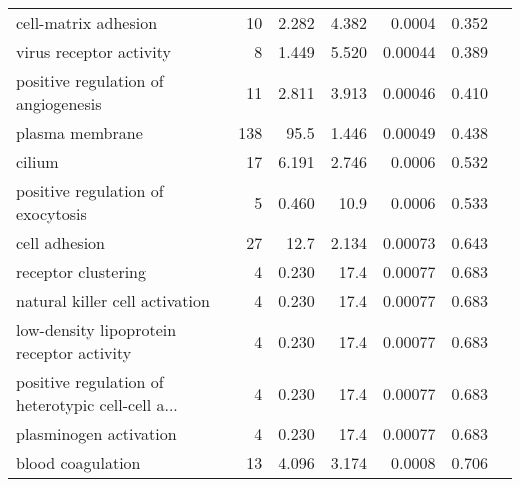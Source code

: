 \begin{longtable}{|l|r|r|r|r|r|}
                              cell-matrix adhesion &                      10 &                   2.282 &      4.382 &               0.0004 &                       0.352~~ \\
                           virus receptor activity &                       8 &                   1.449 &      5.520 &              0.00044 &                       0.389~~ \\
               positive regulation of angiogenesis &                      11 &                   2.811 &      3.913 &              0.00046 &                       0.410~~ \\
                                   plasma membrane &                     138 &                    95.5 &      1.446 &              0.00049 &                       0.438~~ \\
                                            cilium &                      17 &                   6.191 &      2.746 &               0.0006 &                       0.532~~ \\
                 positive regulation of exocytosis &                       5 &                   0.460 &       10.9 &               0.0006 &                       0.533~~ \\
                                     cell adhesion &                      27 &                    12.7 &      2.134 &              0.00073 &                       0.643~~ \\
                               receptor clustering &                       4 &                   0.230 &       17.4 &              0.00077 &                       0.683~~ \\
                    natural killer cell activation &                       4 &                   0.230 &       17.4 &              0.00077 &                       0.683~~ \\
         low-density lipoprotein receptor activity &                       4 &                   0.230 &       17.4 &              0.00077 &                       0.683~~ \\
 positive regulation of heterotypic cell-cell a... &                       4 &                   0.230 &       17.4 &              0.00077 &                       0.683~~ \\
                            plasminogen activation &                       4 &                   0.230 &       17.4 &              0.00077 &                       0.683~~ \\
                                 blood coagulation &                      13 &                   4.096 &      3.174 &               0.0008 &                       0.706~~ \\

\end{longtable}
